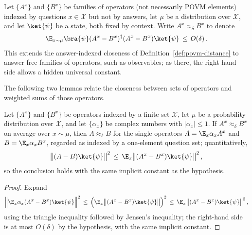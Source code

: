 \begin{definition}
	\label{def:approx-question-indexed-operators}
	\leanok
	Let $\{A^x\}$ and $\{B^x\}$ be families of operators (not necessarily
	POVM elements) indexed by questions $x \in \mathcal{X}$ but not by
	answers, let $\mu$ be a distribution over $\mathcal{X}$, and let
	$\ket{\psi}$ be a state, both fixed by context. Write
	$A^x \approx_\delta B^x$ to denote
	\[
		\E_{x \sim \mu} \bra{\psi} (A^x - B^x)^\dagger (A^x - B^x) \ket{\psi} \,\leq\, O(\delta)\,.
	\]
	This extends the answer-indexed closeness of
	Definition~\ref{def:povm-distance} to answer-free families of operators,
	such as observables; as there, the right-hand side allows a hidden
	universal constant.
\end{definition}

The following two lemmas relate the closeness between sets of operators and
weighted sums of those operators.

\begin{lemma}
	\label{lem:avg-closeness}
	\leanok
	Let $\{A^x\}$ and $\{B^x\}$ be operators indexed by a finite set
	$\mathcal{X}$, let $\mu$ be a probability distribution over
	$\mathcal{X}$, and let $\{\alpha_x\}$ be complex numbers with
	$|\alpha_x| \leq 1$. If $A^x \approx_\delta B^x$ on average over
	$x \sim \mu$, then $A \approx_\delta B$ for the single operators
	$A = \E_{x} \alpha_x A^x$ and $B = \E_{x} \alpha_x B^x$, regarded as
	indexed by a one-element question set; quantitatively,
	\[
		\big\| (A - B) \ket{\psi} \big\|^2
		\,\leq\, \E_x \big\| (A^x - B^x) \ket{\psi} \big\|^2\,,
	\]
	so the conclusion holds with the same implicit constant as the
	hypothesis.
\end{lemma}
\begin{proof}
	\leanok {}
	Expand
	\[
		\Big\| \E_x \alpha_x (A^x - B^x) \ket{\psi} \Big\|^2
		\,\leq\, \Big( \E_x \big\| (A^x - B^x) \ket{\psi} \big\| \Big)^2
		\,\leq\, \E_x \big\| (A^x - B^x) \ket{\psi} \big\|^2\,,
	\]
	using the triangle inequality followed by Jensen's inequality; the
	right-hand side is at most $O(\delta)$ by the hypothesis, with the same
	implicit constant.
\end{proof}

